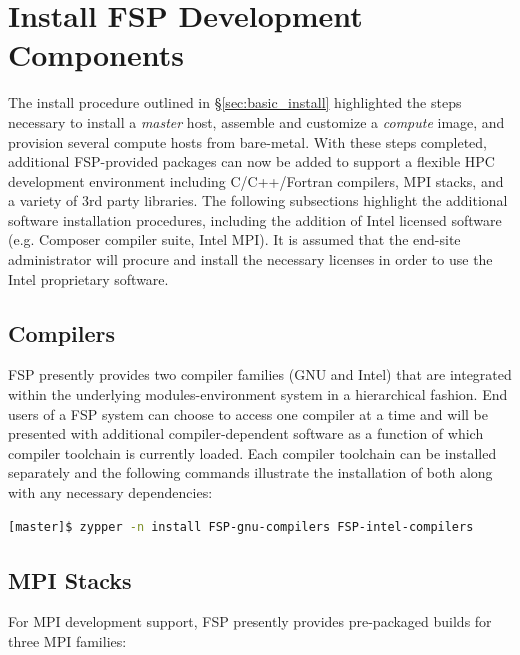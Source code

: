\documentclass[letterpaper]{article}
\begin{document}
{\section{Install FSP Development Components}

The install procedure outlined in \S\ref{sec:basic_install}
highlighted the steps necessary to install a {\em master} host,
assemble and customize a {\em compute} image, and provision several
compute hosts from bare-metal.  With these steps completed, 
additional FSP-provided packages can now be added to support a flexible HPC
development environment including C/C++/Fortran compilers, MPI stacks, and a
variety of 3rd party libraries. The following subsections highlight the
additional software installation procedures, including the addition of Intel
licensed software (e.g. Composer compiler suite, Intel MPI). It is assumed that
the end-site administrator will procure and install the necessary licenses in
order to use the Intel proprietary software.

\subsection{Compilers}

FSP presently provides two compiler families ({GNU} and {Intel}) that are
integrated within the underlying modules-environment system in a hierarchical
fashion. End users of a FSP system can choose to access one compiler at a time
and will be presented with additional compiler-dependent software as a function
of which compiler toolchain is currently loaded. Each compiler toolchain can be
installed separately and the following commands illustrate the installation of
both along with any necessary dependencies:

\begin{lstlisting}[language=bash]
[master]$ zypper -n install FSP-gnu-compilers FSP-intel-compilers
\end{lstlisting}

\subsection{MPI Stacks} \label{sec:mpi}

For MPI development support, FSP presently provides pre-packaged builds for
three MPI families: 

}
\end{document}
